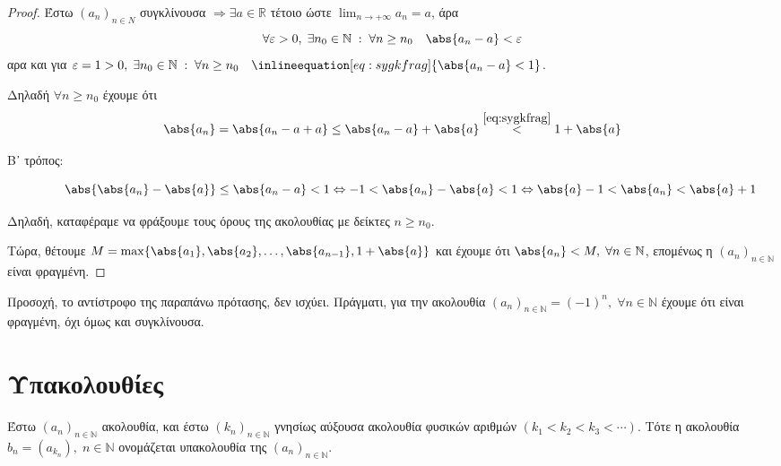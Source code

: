 \documentclass[main.tex]{subfiles}
\begin{document}
\begin{proof}
    Έστω $ (a_{n})_{n \in \mathbb{Ν}} $ συγκλίνουσα $ \Rightarrow \exists 
    a \in \mathbb{R} $ τέτοιο ώστε $ \lim_{n \to +\infty} a_{n}=a $, άρα 
\[
    \forall \varepsilon > 0, \; \exists n_{0} \in \mathbb{N} \; : \; 
    \forall n \geq n_{0}\quad \abs{a_{n}-a} < \varepsilon  
 \] 
 αρα και για $ \varepsilon =1>0, \; \exists n_{0} \in \mathbb{N} \; : \; 
 \forall n \geq n_{0} \quad \inlineequation[eq:sygkfrag]{\abs{a_{n}-a} 
 < 1} $. 
 
 Δηλαδή $ \forall n \geq n_{0} $ έχουμε ότι 
\[
    \abs{a_{n}} = \abs{a_{n}-a + a} \leq \abs{a_{n} - a} + \abs{a} 
    \overset{\eqref{eq:sygkfrag}}{<} 1 + \abs{a}  
 \] 

 \begin{description}
     \item [Β᾽ τρόπος:] \[ \abs{\abs{a_{n}} - \abs{a}} \leq \abs{a_{n}- a} 
             < 1 \Leftrightarrow -1 < \abs{a_{n}} - \abs{a} < 1 
         \Leftrightarrow \abs{a} -1 < \abs{a_{n}} < \abs{a} + 1 \]
 \end{description}

 Δηλαδή, καταφέραμε να φράξουμε τους όρους της ακολουθίας με δείκτες 
 $n \geq n_{0} $.

 Τώρα, θέτουμε $ M = \max \{ \abs{a_{1}} , \abs{a_{2}} , \ldots, 
     \abs{a_{n-1}} , 1 + \abs{a}\} $ και έχουμε ότι $ \abs{a_{n}} < M, \; 
     \forall n \in \mathbb{N} $, επομένως η $ (a_{n})_{n \in \mathbb{N}} $ 
     είναι φραγμένη.
\end{proof}

\begin{rem}
    Προσοχή, το αντίστροφο της παραπάνω πρότασης, δεν ισχύει. Πράγματι, 
    για την  ακολουθία $ (a_{n})_{n \in \mathbb{N}} = (-1)^{n}, \; 
    \forall n \in \mathbb{N} $ έχουμε ότι είναι φραγμένη, όχι όμως και 
    συγκλίνουσα.
\end{rem}

\section{Υπακολουθίες}

\begin{dfn}
    Έστω $ (a_{n})_{n \in \mathbb{N}} $ ακολουθία, και έστω $ (k_{n})_{n \in \mathbb{N}} $ γνησίως
    αύξουσα ακολουθία φυσικών αριθμών $ (k_{1}<k_{2}<k_{3}<\cdots) $. Τότε η ακολουθία 
    $ b_{n} = (a_{k_{n}}), \; n \in \mathbb{N} $ ονομάζεται
    \textcolor{Col\thechapter}{υπακολουθία} της 
    $ (a_{n})_{n \in \mathbb{N}} $.
\end{dfn}
\end{document}
